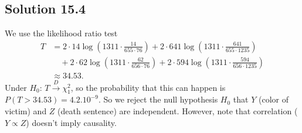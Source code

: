 \subsection*{Solution 15.4}

We use the likelihood ratio test
\begin{equation*}
    \begin{split}
        T &= 2 \cdot 14 \log\left(1311 \cdot \frac{14}{655 \cdot 76} \right)
            + 2 \cdot 641 \log\left(1311 \cdot \frac{641}{655 \cdot 1235} \right) \\
            &\quad + 2 \cdot 62 \log\left(1311 \cdot \frac{62}{656 \cdot 76} \right)
            + 2 \cdot 594 \log\left(1311 \cdot \frac{594}{656 \cdot 1235} \right) \\
        &\approx 34.53.
    \end{split}
\end{equation*}
Under $H_0$: $T \xrightarrow{D} \chi^2_1$, so the probability that this can happen is $P(T > 34.53) = 4.2.10^{-9}$.
So we reject the null hypothesis $H_0$ that $Y$ (color of victim) and $Z$ (death sentence) are independent.
However, note that correlation ($Y \propto Z$) doesn't imply causality.

